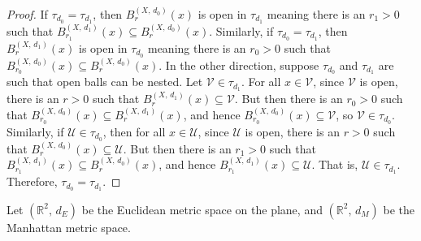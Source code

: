 \documentclass{article}
\theoremstyle{plain}
\theoremstyle{normal}
\newenvironment{example}{%
    \pushQED{\qed}\renewcommand{\qedsymbol}{$\blacksquare$}\examplex%
}{%
    \popQED\endexamplex%
}
\begin{document}
        \begin{proof}
            If $\tau_{d_{0}}=\tau_{d_{1}}$, then
            $B_{r}^{(X,\,d_{0})}(x)$ is open in
            $\tau_{d_{1}}$ meaning there is an $r_{1}>0$ such that
            $B_{r_{1}}^{(X,\,d_{1})}(x)\subseteq{B}_{r}^{(X,\,d_{0})}(x)$.
            Similarly, if $\tau_{d_{0}}=\tau_{d_{1}}$, then
            $B_{r}^{(X,\,d_{1})}(x)$ is open in
            $\tau_{d_{0}}$ meaning there is an $r_{0}>0$ such that
            $B_{r_{0}}^{(X,\,d_{0})}(x)\subseteq{B}_{r}^{(X,\,d_{0})}(x)$.
            In the other direction, suppose $\tau_{d_{0}}$ and
            $\tau_{d_{1}}$ are such that open balls can be nested.
            Let $\mathcal{V}\in\tau_{d_{1}}$. For all
            $x\in\mathcal{V}$, since $\mathcal{V}$ is open, there is an
            $r>0$ such that $B_{r}^{(X,\,d_{1})}(x)\subseteq\mathcal{V}$.
            But then there is an $r_{0}>0$ such that
            $B_{r_{0}}^{(X,\,d_{0})}(x)\subseteq{B}_{r}^{(X,\,d_{1})}(x)$, and
            hence
            $B_{r_{0}}^{(X,\,d_{0})}(x)\subseteq\mathcal{V}$, so
            $\mathcal{V}\in\tau_{d_{0}}$. Similarly, if
            $\mathcal{U}\in\tau_{d_{0}}$, then for all $x\in\mathcal{U}$, since
            $\mathcal{U}$ is open, there is an $r>0$ such that
            $B_{r}^{(X,\,d_{0})}(x)\subseteq\mathcal{U}$. But then there is
            an $r_{1}>0$ such that
            $B_{r_{1}}^{(X,\,d_{1})}(x)\subseteq{B}_{r}^{(X,\,d_{0})}(x)$, and
            hence $B_{r_{1}}^{(X,\,d_{1})}(x)\subseteq\mathcal{U}$. That is,
            $\mathcal{U}\in\tau_{d_{1}}$. Therefore,
            $\tau_{d_{0}}=\tau_{d_{1}}$.
        \end{proof}
        \begin{example}
            Let $(\mathbb{R}^{2},\,d_{E})$ be the Euclidean metric space on the
            plane, and $(\mathbb{R}^{2},\,d_{M})$ be the Manhattan metric space.
        \end{example}
\end{document}
